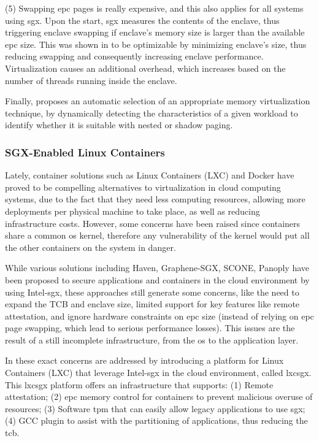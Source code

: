 (5) Swapping \gls{epc} pages is really expensive, and this also applies for all systems using \gls{sgx}. 
Upon the start, \gls{sgx} measures the contents of the enclave, thus triggering enclave swapping if enclave's memory size is larger than the available \gls{epc} size. 
This was shown in \cite{sgxVirtualizationPaper} to be optimizable by minimizing enclave's size, thus reducing swapping and consequently increasing enclave performance.
Virtualization causes an additional overhead, which increases based on the number of threads running inside the enclave.

Finally, \cite{sgxVirtualizationPaper} proposes an automatic selection of an appropriate memory virtualization technique, by dynamically detecting the characteristics of a given workload to identify whether it is suitable with nested or shadow paging.


\subsubsection{SGX-Enabled Linux Containers}
Lately, container solutions such as Linux Containers (LXC) and Docker have proved to be compelling alternatives to virtualization in cloud computing systems, due to the fact that they need less computing resources, allowing more deployments per physical machine to take place, as well as reducing infrastructure costs. However, some concerns have been raised since containers share a common \gls{os} kernel, therefore any vulnerability of the kernel would put all the other containers on the system in danger.

While various solutions including Haven, Graphene-SGX, SCONE, Panoply have been proposed to secure applications and containers in the cloud environment by using Intel-\gls{sgx}, these approaches still generate some concerns, like the need to expand the TCB and enclave size, limited support for key features like remote attestation, and ignore hardware constraints on \gls{epc} size (instead of relying on \gls{epc} page swapping, which lead to serious performance losses). 
This issues are the result of a still incomplete infrastructure, from the \gls{os} to the application layer. 

In \cite{lxcsgxPaper} these exact concerns are addressed by introducing a platform for Linux Containers (LXC) that leverage Intel-\gls{sgx} in the cloud environment, called lxcsgx. 
This lxcsgx platform offers an infrastructure that supports: (1) Remote attestation; (2) \gls{epc} memory control for containers to prevent malicious overuse of resources; (3) Software \gls{tpm} that can easily allow legacy applications to use \gls{sgx}; (4) GCC plugin to assist with the partitioning of applications, thus reducing the \gls{tcb}.

